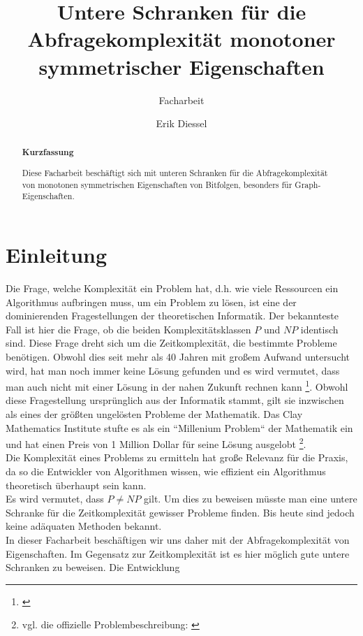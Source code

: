 \documentclass[a4paper]{scrreprt}
\title{Untere Schranken für die Abfragekomplexität 
       monotoner symmetrischer Eigenschaften}
\subtitle{Facharbeit}
\author{Erik Diessel}
\theoremstyle{definition}
\begin{document}
\maketitle

\begin{abstract}
\begin{center}
\bf{Kurzfassung}
\end{center}
Diese Facharbeit beschäftigt sich mit unteren Schranken
für die Abfragekomplexität von monotonen symmetrischen
Eigenschaften von Bitfolgen, besonders für Graph-Eigenschaften.
\end{abstract}

\tableofcontents
\thispagestyle{empty}

\chapter{Einleitung}
Die Frage, welche Komplexität ein Problem hat, d.h.
wie viele Ressourcen ein Algorithmus aufbringen muss,
um ein Problem zu lösen, ist eine der dominierenden
Fragestellungen der theoretischen Informatik.
Der bekannteste Fall ist hier die Frage, ob die beiden
Komplexitätsklassen $P$ und $NP$ identisch sind. Diese
Frage dreht sich um die Zeitkomplexität, die bestimmte
Probleme benötigen. Obwohl dies seit mehr als 40 Jahren
mit großem Aufwand untersucht wird, hat man noch
immer keine Lösung gefunden und es wird vermutet, dass
man auch nicht mit einer Lösung in der nahen Zukunft
rechnen kann \footnote{\cite{PvsNP}}.
Obwohl diese Fragestellung ursprünglich aus der
Informatik stammt, gilt sie inzwischen als eines der
größten ungelösten Probleme der Mathematik. Das Clay
Mathematics Institute stufte es als ein ``Millenium Problem``
der Mathematik ein und hat einen Preis von
1 Million Dollar für seine Lösung ausgelobt
\footnote{vgl. die offizielle Problembeschreibung:
\cite{PvsNPOfficial}}. \\
Die Komplexität eines Problems zu ermitteln hat
große Relevanz für die Praxis, da so die Entwickler
von Algorithmen wissen, wie effizient ein Algorithmus
theoretisch überhaupt sein kann. \\
Es wird vermutet, dass $P\neq NP$ gilt. Um dies zu beweisen
müsste man eine untere Schranke für die Zeitkomplexität
gewisser Probleme finden. Bis heute sind jedoch
keine adäquaten Methoden bekannt. \\
In dieser Facharbeit beschäftigen wir uns daher mit
der  Abfragekomplexität von Eigenschaften. Im Gegensatz
zur Zeitkomplexität ist es hier möglich gute
untere Schranken zu beweisen. Die Entwicklung
\end{document}

